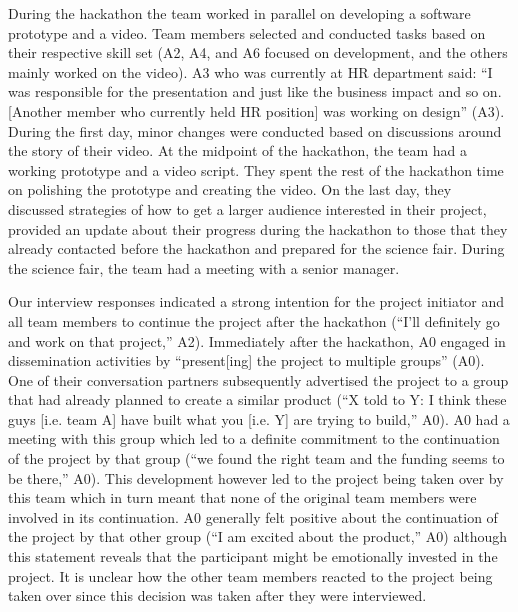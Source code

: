 \documentclass{hcij}
\begin{document}
During the hackathon the team worked in parallel on developing a software prototype and a video. Team members selected and conducted tasks based on their respective skill set (A2, A4, and A6 focused on development, and the others mainly worked on the video). A3 who was currently at HR department said: “I was responsible for the presentation and just like the business impact and so on. [Another member who currently held HR position] was working on design” (A3). During the first day, minor changes were conducted based on discussions around the story of their video. At the midpoint of the hackathon, the team had a working prototype and a video script. They spent the rest of the hackathon time on polishing the prototype and creating the video. On the last day, they discussed strategies of how to get a larger audience interested in their project, provided an update about their progress during the hackathon to those that they already contacted before the hackathon and prepared for the science fair. During the science fair, the team had a meeting with a senior manager.

Our interview responses indicated a strong intention for the project initiator and all team members to continue the project after the hackathon (“I’ll definitely go and work on that project,” A2). Immediately after the hackathon, A0 engaged in dissemination activities by “present[ing] the project to multiple groups” (A0). One of their conversation partners subsequently advertised the project to a group that had already planned to create a similar product (“X told to Y: I think these guys [i.e. team A] have built what you [i.e. Y] are trying to build,” A0). A0 had a meeting with this group which led to a definite commitment to the continuation of the project by that group (“we found the right team and the funding seems to be there,” A0). This development however led to the project being taken over by this team which in turn meant that none of the original team members were involved in its continuation. A0 generally felt positive about the continuation of the project by that other group (“I am excited about the product,” A0) although this statement reveals that the participant might be emotionally invested in the project. It is unclear how the other team members reacted to the project being taken over since this decision was taken after they were interviewed.
\end{document}
